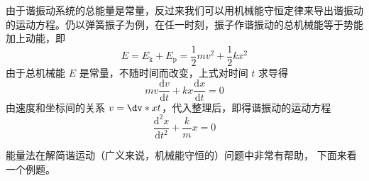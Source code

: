 

由于谐振动系统的总能量是常量，反过来我们可以用机械能守恒定律来导出谐振动的运动方程。仍以弹簧振子为例，在任一时刻，振子作谐振动的总机械能等于势能加上动能，即
\begin{equation}
E=E_{\mathrm k}+E_{\mathrm p}=\frac{1}{2} m v^{2}+\frac{1}{2} k x^{2}
\end{equation}
由于总机械能 $E$ 是常量，不随时间而改变，上式对时间 $t$ 求导得
\begin{equation}
m v \frac{\mathrm{d} v}{\mathrm{d} t}+k x \frac{\mathrm{d} x}{\mathrm{d} t}=0
\end{equation}
由速度和坐标间的关系 $v = \dv*{x}{t}$，代入整理后，即得谐振动的运动方程
\begin{equation}
\frac{\mathrm{d}^{2} x}{\mathrm{d} t^{2}}+\frac{k}{m} x=0
\end{equation}

能量法在解简谐运动（广义来说，机械能守恒的）问题中非常有帮助， 下面来看一个例题。 

